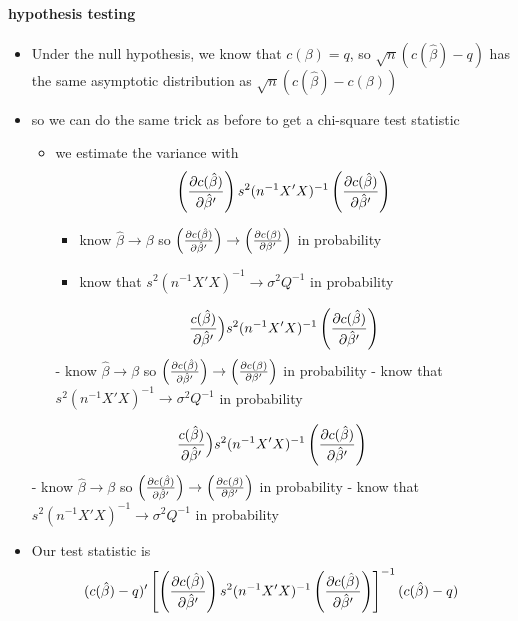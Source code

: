 \paragraph{hypothesis testing}
\begin{itemize}
\item Under the null hypothesis, we know that $c(\beta) = q$, so
        $\sqrt{n}(c(\hat\beta) - q)$ has the same asymptotic
        distribution as $\sqrt{n}(c(\hat\beta) - c(\beta))$
\item so we can do the same trick as before to get a chi-square test
        statistic
\begin{itemize}
\item we estimate the variance with \[ \left({\partial
        c(\hat\beta) \over \partial \hat\beta'}\right)s^2 (n^{-1}X'X)^{-1}
        \left({\partial c(\hat\beta) \over \partial \hat\beta'}\right)\]
\begin{itemize}
\item know $\hat\beta \to \beta$ so $\left({\partial c(\hat\beta)
            \over \partial \hat\beta'}\right) \to \left({\partial
            c(\beta) \over \partial \beta'}\right)$ in probability
\item know that $s^2 (n^{-1} X'X)^{-1} \to \sigma^2Q^{-1}$ in
            probability
\end{itemize}
\[{c(\hat\beta) \over \partial \hat\beta'}\Big)s^2 (n^{-1}X'X)^{-1}
        \left({\partial c(\hat\beta) \over \partial \hat\beta'}\right)\]
          - know $\hat\beta \to \beta$ so $\left({\partial c(\hat\beta)
            \over \partial \hat\beta'}\right) \to \left({\partial
            c(\beta) \over \partial \beta'}\right)$ in probability
          - know that $s^2 (n^{-1} X'X)^{-1} \to \sigma^2Q^{-1}$ in
            probability
\end{itemize}
\[{c(\hat\beta) \over \partial \hat\beta'}\Big)s^2 (n^{-1}X'X)^{-1}
        \left({\partial c(\hat\beta) \over \partial \hat\beta'}\right)\]
          - know $\hat\beta \to \beta$ so $\left({\partial c(\hat\beta)
            \over \partial \hat\beta'}\right) \to \left({\partial
            c(\beta) \over \partial \beta'}\right)$ in probability
          - know that $s^2 (n^{-1} X'X)^{-1} \to \sigma^2Q^{-1}$ in
            probability
\item Our test statistic is 
        \[ (c(\hat\beta) - q)' \left[\left({\partial
        c(\hat\beta) \over \partial \hat\beta'}\right)s^2 (n^{-1}X'X)^{-1}
        \left({\partial c(\hat\beta) \over \partial \hat\beta'}\right) \right]^{-1}
        (c(\hat\beta) - q) \]

\end{itemize}
